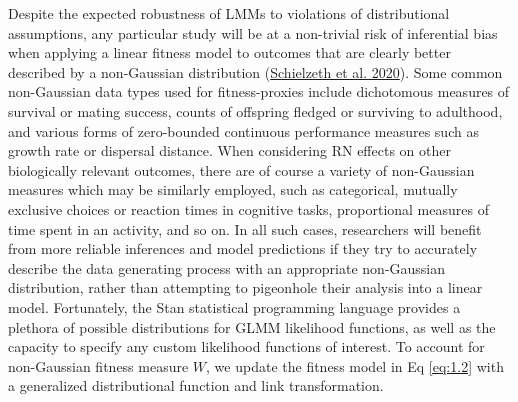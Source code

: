 \documentclass{article}
\begin{document}
Despite the expected robustness of LMMs to violations of distributional
assumptions, any particular study will be at a non-trivial risk of
inferential bias when applying a linear fitness model to outcomes that
are clearly better described by a non-Gaussian distribution
(\protect\hyperlink{ref-Schiel2020}{Schielzeth et al. 2020}). Some
common non-Gaussian data types used for fitness-proxies include
dichotomous measures of survival or mating success, counts of offspring
fledged or surviving to adulthood, and various forms of zero-bounded
continuous performance measures such as growth rate or dispersal
distance. When considering RN effects on other biologically relevant
outcomes, there are of course a variety of non-Gaussian measures which
may be similarly employed, such as categorical, mutually exclusive
choices or reaction times in cognitive tasks, proportional measures of
time spent in an activity, and so on. In all such cases, researchers
will benefit from more reliable inferences and model predictions if they
try to accurately describe the data generating process with an
appropriate non-Gaussian distribution, rather than attempting to
pigeonhole their analysis into a linear model. Fortunately, the Stan
statistical programming language provides a plethora of possible
distributions for GLMM likelihood functions, as well as the capacity to
specify any custom likelihood functions of interest. To account for
non-Gaussian fitness measure \(W\), we update the fitness model in Eq
\ref{eq:1.2} with a generalized distributional function and link
transformation.
\end{document}
